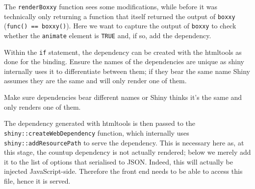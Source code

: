 \documentclass[10pt,]{krantz}
\makeatletter
\newenvironment{Shaded}{\begin{snugshade}}{\end{snugshade}}
\newcommand{\CommentTok}[1]{\textcolor[rgb]{0.37,0.37,0.37}{\textit{#1}}}
\newcommand{\ControlFlowTok}[1]{\textcolor[rgb]{0.27,0.27,0.27}{\textbf{#1}}}
\newcommand{\DataTypeTok}[1]{\textcolor[rgb]{0.27,0.27,0.27}{#1}}
\newcommand{\KeywordTok}[1]{\textcolor[rgb]{0.27,0.27,0.27}{\textbf{#1}}}
\newcommand{\NormalTok}[1]{#1}
\newcommand{\OperatorTok}[1]{\textcolor[rgb]{0.43,0.43,0.43}{\textbf{#1}}}
\newcommand{\OtherTok}[1]{\textcolor[rgb]{0.37,0.37,0.37}{#1}}
\newcommand{\StringTok}[1]{\textcolor[rgb]{0.5,0.5,0.5}{#1}}
\newenvironment{kframe}{%
\medskip{}
\setlength{\fboxsep}{.8em}
 \def\at@end@of@kframe{}%
 \ifinner\ifhmode%
  \def\at@end@of@kframe{\end{minipage}}%
  \begin{minipage}{\columnwidth}%
 \fi\fi%
 \def\FrameCommand##1{\hskip\@totalleftmargin \hskip-\fboxsep
 \colorbox{shadecolor}{##1}\hskip-\fboxsep
     \hskip-\linewidth \hskip-\@totalleftmargin \hskip\columnwidth}%
 \MakeFramed {\advance\hsize-\width
   \@totalleftmargin\z@ \linewidth\hsize
   \@setminipage}}%
 {\par\unskip\endMakeFramed%
 \at@end@of@kframe}
\renewenvironment{Shaded}{\begin{kframe}}{\end{kframe}}
\newenvironment{rmdblock}[1]
  {
  \begin{itemize}
  \renewcommand{\labelitemi}{
    \raisebox{-.7\height}[0pt][0pt]{
      {\setkeys{Gin}{width=3em,keepaspectratio}\texttt{[image: images/\#1]}}
    }
  }
  \setlength{\fboxsep}{1em}
  \begin{kframe}
  \item
  }
  {
  \end{kframe}
  \end{itemize}
  }
\newenvironment{rmdnote}
  {\begin{rmdblock}{note}}
  {\end{rmdblock}}
\makeatother
\begin{document}
The \texttt{renderBoxxy} function sees some modifications, while before it was technically only returning a function that itself returned the output of \texttt{boxxy} (\texttt{func()\ ==\ boxxy()}). Here we want to capture the output of \texttt{boxxy} to check whether the \texttt{animate} element is \texttt{TRUE} and, if so, add the dependency.

\begin{Shaded}
\end{Shaded}

Within the \texttt{if} statement, the dependency can be created with the htmltools as done for the binding. Ensure the names of the dependencies are unique as shiny internally uses it to differentiate between them; if they bear the same name Shiny assumes they are the same and will only render one of them.

\begin{rmdnote}
Make sure dependencies bear different names or Shiny
thinks it's the same and only renders one of them.
\end{rmdnote}

The dependency generated with htmltools is then passed to the \texttt{shiny::createWebDependency} function, which internally uses \texttt{shiny::addResourcePath} to serve the dependency. This is necessary here as, at this stage, the countup dependency is not actually rendered; below we merely add it to the list of options that serialised to JSON. Indeed, this will actually be injected JavaScript-side. Therefore the front end needs to be able to access this file, hence it is served.
\end{document}
